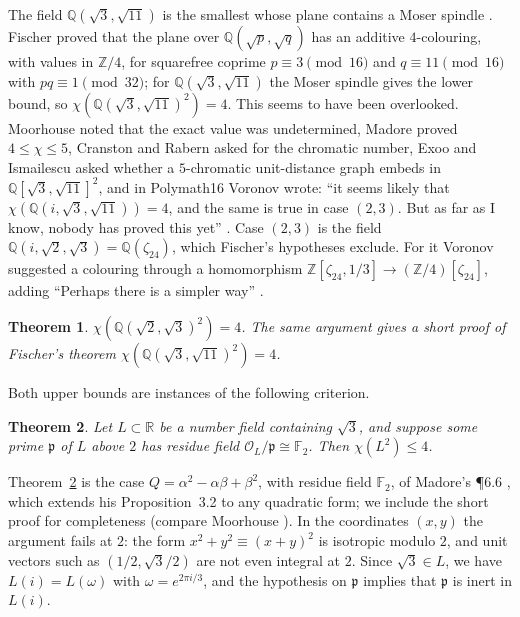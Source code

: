 \documentclass[11pt,a4paper]{amsart}
\newtheorem{theorem}{Theorem}
\theoremstyle{remark}
\newcommand{\F}{\mathbb{F}}
\newcommand{\Q}{\mathbb{Q}}
\newcommand{\R}{\mathbb{R}}
\newcommand{\Z}{\mathbb{Z}}
\newcommand{\p}{\mathfrak{p}}
\begin{document}
The field $\Q(\sqrt3,\sqrt{11})$ is the smallest whose plane contains a Moser spindle \cite{Moser}. Fischer
\cite{Fischer1994} proved that the plane over $\Q(\sqrt p,\sqrt q)$ has an additive $4$-colouring, with values in
$\Z/4$, for squarefree coprime $p\equiv3\pmod{16}$ and $q\equiv11\pmod{16}$ with $pq\equiv1\pmod{32}$; for
$\Q(\sqrt3,\sqrt{11})$ the Moser spindle gives the lower bound, so $\chi(\Q(\sqrt3,\sqrt{11})^2)=4$. This seems
to have been overlooked. Moorhouse \cite{Moorhouse} noted that the exact value was undetermined, Madore
\cite{Madore} proved $4\le\chi\le5$, Cranston and Rabern \cite{CranstonRabern} asked for the chromatic number,
Exoo and Ismailescu \cite{ExooIsmailescu} asked whether a $5$-chromatic unit-distance graph embeds in
$\Q[\sqrt3,\sqrt{11}]^2$, and in Polymath16 Voronov wrote: ``it seems likely that
$\chi(\Q(i,\sqrt3,\sqrt{11}))=4$, and the same is true in case $(2,3)$. But as far as I know, nobody has proved
this yet'' \cite{Polymath17}. Case $(2,3)$ is the field $\Q(i,\sqrt2,\sqrt3)=\Q(\zeta_{24})$, which Fischer's
hypotheses exclude. For it Voronov suggested a colouring through a homomorphism
$\Z[\zeta_{24},1/3]\to(\Z/4)[\zeta_{24}]$, adding ``Perhaps there is a simpler way'' \cite{Polymath17}.

\begin{theorem}\label{thm:main}
$\chi(\Q(\sqrt2,\sqrt3)^2)=4$. The same argument gives a short proof of Fischer's theorem
$\chi(\Q(\sqrt3,\sqrt{11})^2)=4$.
\end{theorem}

Both upper bounds are instances of the following criterion.

\begin{theorem}\label{thm:criterion}
Let $L\subset\R$ be a number field containing $\sqrt3$, and suppose some prime $\p$ of $L$ above $2$ has residue
field $\mathcal{O}_L/\p\cong\F_2$. Then $\chi(L^2)\le4$.
\end{theorem}

Theorem~\ref{thm:criterion} is the case $Q=\alpha^2-\alpha\beta+\beta^2$, with residue field $\F_2$, of Madore's
\P6.6 \cite{Madore}, which extends his Proposition~3.2 to any quadratic form; we include the short proof for
completeness (compare Moorhouse \cite[Lemma~4.2 and Theorem~7.1]{Moorhouse}). In the coordinates $(x,y)$ the
argument fails at $2$: the form $x^2+y^2\equiv(x+y)^2$ is isotropic modulo $2$, and unit vectors such as
$(1/2,\sqrt3/2)$ are not even integral at $2$. Since $\sqrt3\in L$, we have $L(i)=L(\omega)$ with
$\omega=e^{2\pi i/3}$, and the hypothesis on $\p$ implies that $\p$ is inert in $L(i)$.
\end{document}
